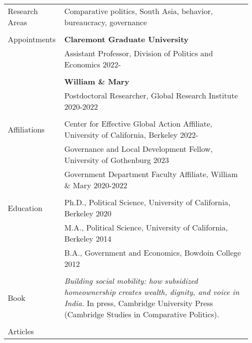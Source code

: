 \documentclass[letterpaper, 10.5pt]{article}
\begin{document}
\begin{longtable}{p{1.5in}p{5in}}

Research Areas & Comparative politics, South Asia,  behavior, bureaucracy,  governance \\
& \\
Appointments 
& \textbf{Claremont Graduate University} \hfill  \\
& Assistant Professor, Division of Politics and Economics \hfill  2022-\\

& \\

& \textbf{William \& Mary} \hfill \\
& Postdoctoral Researcher, Global Research Institute \hfill 2020-2022 \\


& \\

Affiliations & Center for Effective Global Action Affiliate, University of California,  Berkeley \hfill 2022-\\ 
& Governance and Local Development Fellow, University of Gothenburg \hfill 2023\\


& Government Department Faculty Affiliate, William \& Mary \hfill 2020-2022  \\
& \\
{Education} 
&Ph.D., Political Science, University of California, Berkeley \hfill 2020 \\


& M.A., Political Science, University of California, Berkeley \hfill 2014 \\
& B.A., Government and Economics, Bowdoin College  \hfill 2012 \\

& \\

Book &  \textit{Building social mobility: how subsidized homeownership creates wealth, dignity, and voice in India.} In press, Cambridge University Press (Cambridge Studies in Comparative Politics).\\

& \\

\nohyphens{{Articles}} 


\end{longtable}
\end{document}
